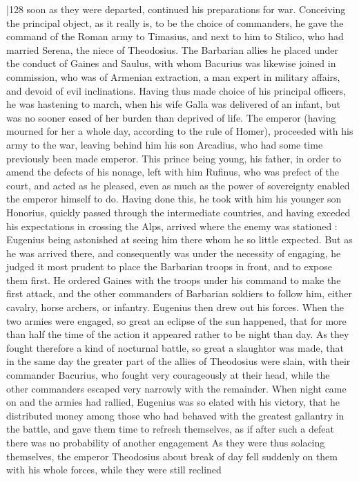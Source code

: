 |128
soon as they were departed, continued his preparations for war. Conceiving the principal object, as it really is, to be the choice of commanders, he gave the command of the Roman army to Timasius, and next to him to Stilico, who had married Serena, the niece of Theodosius. The Barbarian allies he placed under the conduct of Gaines and Saulus, with whom Bacurius was likewise joined in commission, who was of Armenian extraction, a man expert in military affairs, and devoid of evil inclinations. Having thus made choice of his principal officers, he was hastening to march, when his wife Galla was delivered of an infant, but was no sooner eased of her burden than deprived of life. The emperor (having mourned for her a whole day, according to the rule of Homer), proceeded with his army to the war, leaving behind him his son Arcadius, who had some time previously been made emperor. This prince being young, his father, in order to amend the defects of his nonage, left with him Rufinus, who was prefect of the court, and acted as he pleased, even as much as the power of sovereignty enabled the emperor himself to do. Having done this, he took with him his younger son Honorius, quickly passed through the intermediate countries, and having exceded his expectations in crossing the Alps, arrived where the enemy was stationed : Eugenius being astonished at seeing him there whom he so little expected. But as he was arrived there, and consequently was under the necessity of engaging, he judged it most prudent to place the Barbarian troops in front, and to expose them first. He ordered Gaines with the troops under his command to make the first attack, and the other commanders of Barbarian soldiers to follow him, either cavalry, horse archers, or infantry. Eugenius then drew out his forces. When the two armies were engaged, so great an eclipse of the sun happened, that for more than half the time of the action it appeared rather to be night than day. As they fought therefore a kind of nocturnal battle, so great a slaughtor was made, that in the same day the greater part of the allies of Theodosius were slain, with their commander Bacurius, who fought very courageously at their head, while the other commanders escaped very narrowly with the remainder. When night came on and the armies had rallied, Eugenius was so elated with his victory, that he distributed money among those who had behaved with the greatest gallantry in the battle, and gave them time to refresh themselves, as if after such a defeat there was no probability of another engagement As they were thus solacing themselves, the emperor Theodosius about break of day fell suddenly on them with his whole forces, while they were still reclined
